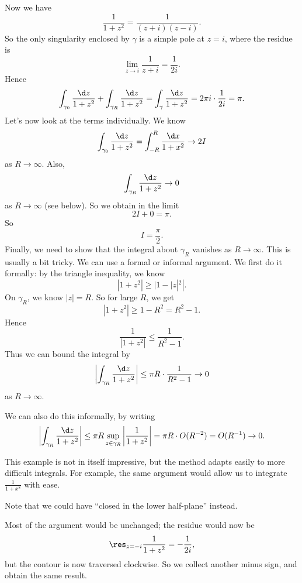 \documentclass[a4paper]{article}
\begin{document}
\begin{eg}
\begin{center}
  \end{center}
  Now we have
  \[
    \frac{1}{1 + z^2} = \frac{1}{(z + i)(z - i)}.
  \]
  So the only singularity enclosed by $\gamma$ is a simple pole at $z = i$, where the residue is
  \[
    \lim_{z \to i} \frac{1}{z + i} = \frac{1}{2i}.
  \]
  Hence
  \[
    \int_{\gamma_0} \frac{\d z}{1 + z^2} + \int_{\gamma_R} \frac{\d z}{1 + z^2} = \int_\gamma \frac{\d z}{1 + z^2}= 2\pi i \cdot \frac{1}{2i} = \pi.
  \]
  Let's now look at the terms individually. We know
  \[
    \int_{\gamma_0} \frac{\d z}{1 + z^2} = \int_{-R}^R \frac{\d x}{1 + x^2} \to 2I
  \]
  as $R \to \infty$. Also,
  \[
    \int_{\gamma_R} \frac{\d z}{1 + z^2} \to 0
  \]
  as $R \to \infty$ (see below). So we obtain in the limit
  \[
    2I + 0 = \pi.
  \]
  So
  \[
    I = \frac{\pi}{2}.
  \]
  Finally, we need to show that the integral about $\gamma_R$ vanishes as $R \to \infty$. This is usually a bit tricky. We can use a formal or informal argument. We first do it formally: by the triangle inequality, we know
  \[
    |1 + z^2| \geq |1 - |z|^2|.
  \]
  On $\gamma_R$, we know $|z| = R$. So for large $R$, we get
  \[
    |1 + z^2| \geq 1 - R^2 = R^2 - 1.
  \]
  Hence
  \[
    \frac{1}{|1 + z^2|} \leq \frac{1}{R^2 - 1}.
  \]
  Thus we can bound the integral by
  \[
    \left|\int_{\gamma_R} \frac{\d z}{1 + z^2}\right| \leq \pi R \cdot \frac{1}{R^2 - 1} \to 0
  \]
  as $R \to \infty$.

  We can also do this informally, by writing
  \[
    \left|\int_{\gamma_R} \frac{\d z}{1 + z^2}\right| \leq \pi R \sup_{z \in \gamma_R} \left|\frac{1}{1 + z^2}\right| = \pi R \cdot O(R^{-2}) = O(R^{-1}) \to 0.
  \]
\end{eg}
This example is not in itself impressive, but the method adapts easily to more difficult integrals. For example, the same argument would allow us to integrate $\frac{1}{1 + x^8}$ with ease.

Note that we could have ``closed in the lower half-plane'' instead.
\begin{center}
\end{center}
Most of the argument would be unchanged; the residue would now be
\[
  \res_{z = -i} \frac{1}{1 + z^2} = -\frac{1}{2i},
\]
but the contour is now traversed clockwise. So we collect another minus sign, and obtain the same result.
\end{document}
